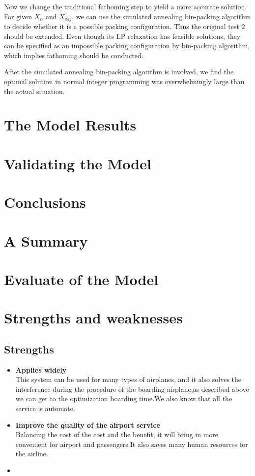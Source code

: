 \documentclass{mcmthesis}
\begin{document}
\noindent Now we change the traditional fathoming step to yield a more accurate solution. For given $X_\alpha$ and $X_{\alpha ij}$, we can use the simulated annealing bin-packing algorithm to decide whether it is a possible packing configuration. Thus the original test 2 should be extended. Even though its LP relaxation has feasible solutions, they can be specified as an impossible packing configuration by bin-packing algorithm, which implies fathoming should be conducted. 

\noindent After the simulated annealing bin-packing algorithm is involved, we find the optimal solution in normal integer programming was overwhelmingly large than the actual situation. 

\section{The Model Results}
\lipsum[6]

\section{Validating the Model}
\lipsum[9]

\section{Conclusions}
\lipsum[6]

\section{A Summary}
\lipsum[6]

\section{Evaluate of the Model}

\section{Strengths and weaknesses}
\lipsum[12]

\subsection{Strengths}
\begin{itemize}
\item \textbf{Applies widely}\\
This  system can be used for many types of airplanes, and it also
solves the interference during  the procedure of the boarding
airplane,as described above we can get to the  optimization
boarding time.We also know that all the service is automate.
\item \textbf{Improve the quality of the airport service}\\
Balancing the cost of the cost and the benefit, it will bring in
more convenient  for airport and passengers.It also saves many
human resources for the airline. \item \textbf{}
\end{itemize}
\end{document}
